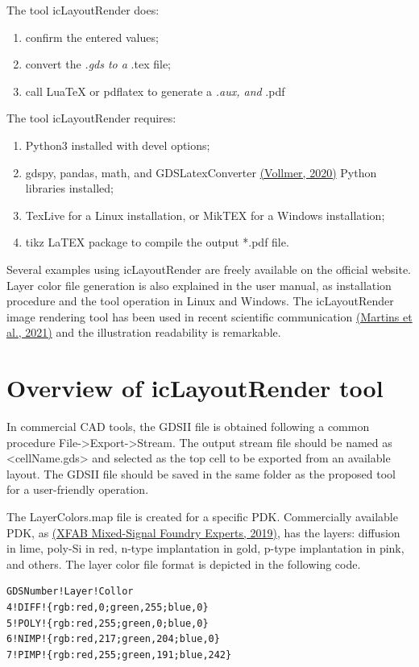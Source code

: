 \documentclass[10pt,a4paper,onecolumn]{article}
\begin{document}
The tool icLayoutRender does:
\begin{enumerate}
 \item confirm the entered values; 
 \item convert the \emph{.gds to a }.tex file;
 \item call LuaTeX or pdflatex to generate a \emph{.aux, and }.pdf
\end{enumerate}
The tool icLayoutRender requires:
\begin{enumerate}
 \item Python3 installed with devel options; 
\item gdspy, pandas, math, and GDSLatexConverter \hyperlink{ref-Vollmer2020}{(Vollmer, 2020)} Python libraries installed; 
\item TexLive for a Linux installation, or MikTEX for a Windows installation; 
\item tikz LaTEX package to compile the output *.pdf file.
\end{enumerate}

Several examples using icLayoutRender are freely available on the
official website. Layer color file generation is also explained in the
user manual, as installation procedure and the tool operation in Linux
and Windows. The icLayoutRender image rendering tool has been used in
recent scientific communication \hyperlink{ref-Martins2021}{(Martins et al., 2021)} and the
illustration readability is remarkable.

\hypertarget{overview-of-iclayoutrender-tool}{%
\section{Overview of icLayoutRender tool}\label{overview-of-iclayoutrender-tool}}

In commercial CAD tools, the GDSII file is obtained following a common
procedure File-\textgreater Export-\textgreater Stream. The output
stream file should be named as \textless cellName.gds\textgreater{} and
selected as the top cell to be exported from an available layout. The
GDSII file should be saved in the same folder as the proposed tool for a
user-friendly operation.

The LayerColors.map file is created for a specific PDK. Commercially
available PDK, as \hyperlink{ref-XFAB2019}{(XFAB
Mixed-Signal Foundry Experts, 2019)}, has the
layers: diffusion in lime, poly-Si in red, n-type implantation in gold,
p-type implantation in pink, and others. The layer color file format is
depicted in the following code.
\begin{verbatim}
GDSNumber!Layer!Collor
4!DIFF!{rgb:red,0;green,255;blue,0}
5!POLY!{rgb:red,255;green,0;blue,0}
6!NIMP!{rgb:red,217;green,204;blue,0}
7!PIMP!{rgb:red,255;green,191;blue,242}
\end{verbatim}
\end{document}
